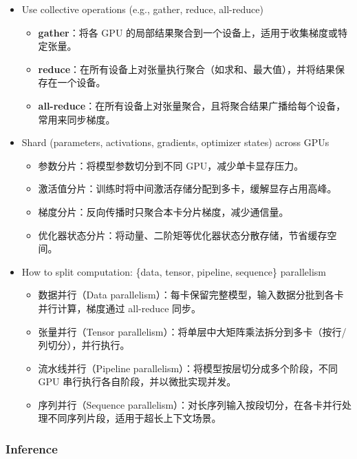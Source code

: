 \begin{itemize}[leftmargin=*]
  \item Use collective operations (e.g., gather, reduce, all-reduce)
    \begin{itemize}[leftmargin=0em, noitemsep]
      \item \textbf{gather}：将各 GPU 的局部结果聚合到一个设备上，适用于收集梯度或特定张量。
      \item \textbf{reduce}：在所有设备上对张量执行聚合（如求和、最大值），并将结果保存在一个设备。
      \item \textbf{all-reduce}：在所有设备上对张量聚合，且将聚合结果广播给每个设备，常用来同步梯度。
    \end{itemize}

  \item Shard (parameters, activations, gradients, optimizer states) across GPUs
    \begin{itemize}[leftmargin=0em, noitemsep]
      \item 参数分片：将模型参数切分到不同 GPU，减少单卡显存压力。
      \item 激活值分片：训练时将中间激活存储分配到多卡，缓解显存占用高峰。
      \item 梯度分片：反向传播时只聚合本卡分片梯度，减少通信量。
      \item 优化器状态分片：将动量、二阶矩等优化器状态分散存储，节省缓存空间。
    \end{itemize}

  \item How to split computation: \{data, tensor, pipeline, sequence\} parallelism
    \begin{itemize}[leftmargin=0em, noitemsep]
      \item 数据并行（Data parallelism）：每卡保留完整模型，输入数据分批到各卡并行计算，梯度通过 all-reduce 同步。
      \item 张量并行（Tensor parallelism）：将单层中大矩阵乘法拆分到多卡（按行/列切分），并行执行。
      \item 流水线并行（Pipeline parallelism）：将模型按层切分成多个阶段，不同 GPU 串行执行各自阶段，并以微批实现并发。
      \item 序列并行（Sequence parallelism）：对长序列输入按段切分，在各卡并行处理不同序列片段，适用于超长上下文场景。
    \end{itemize}
\end{itemize}

    
\subsubsection{Inference}

